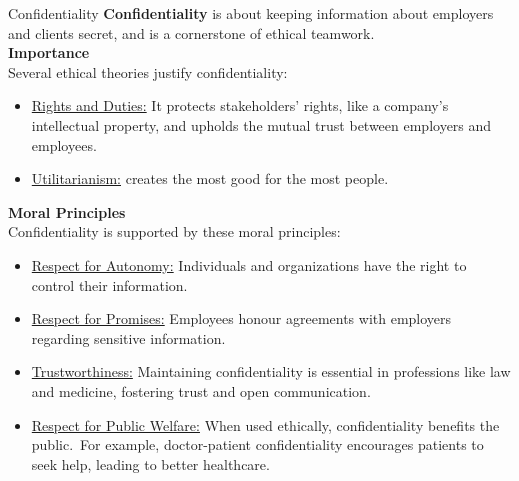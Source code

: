 \documentclass[11pt]{beamer}
\begin{document}
    \begin{frame}[t,allowframebreaks]{Confidentiality}
        \textbf{Confidentiality} is about keeping information about employers and clients secret, and is a
        cornerstone of ethical teamwork.
        \\[10pt]
        \textbf{Importance}\\[5pt]
        Several ethical theories justify confidentiality:\\[5pt]
        \begin{itemize}
            \item \ul{Rights and Duties:} It protects stakeholders' rights, like a company's intellectual
            property, and upholds the mutual trust between employers and employees.
            \item \ul{Utilitarianism:} creates the most good for the most people.
        \end{itemize}

        \framebreak

        \textbf{Moral Principles}\\[5pt]
        Confidentiality is supported by these moral principles:\\[5pt]
        \begin{itemize}
            \item \ul{Respect for Autonomy:} Individuals and organizations have the right to control their
            information.
            \item \ul{Respect for Promises:} Employees honour agreements with employers regarding sensitive
            information.
            \item \ul{Trustworthiness:} Maintaining confidentiality is essential in professions like law and
            medicine, fostering trust and open communication.
            \item \ul{Respect for Public Welfare:} When used ethically, confidentiality benefits the public.\ For
            example, doctor-patient confidentiality encourages patients to seek help, leading to better healthcare.
        \end{itemize}

        \framebreak


\end{frame}
\end{document}
